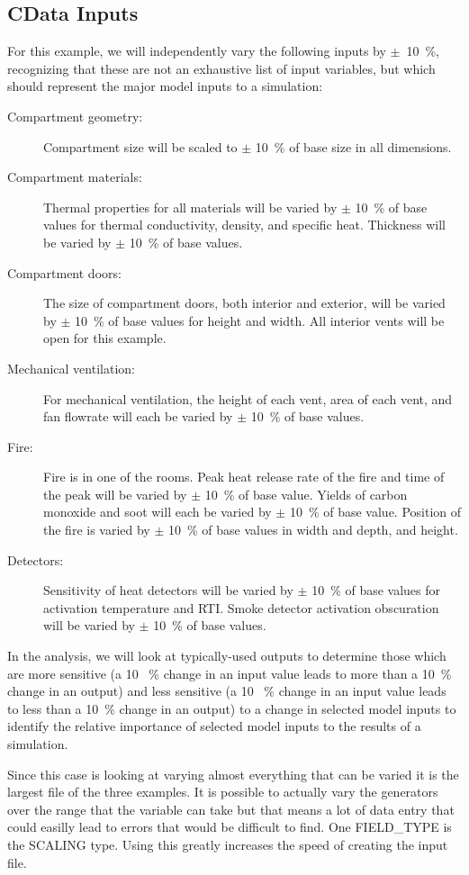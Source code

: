 \documentclass[12pt,twoside]{book}
\begin{document}
\subsection{CData Inputs}
For this example, we will independently vary the following inputs by $\pm$~10~\%, recognizing that these are not an exhaustive list of input variables, but which should represent the major model inputs to a simulation:

\begin{description}
\item[Compartment geometry:] Compartment size will be scaled to $\pm$ 10~\% of base size in all dimensions.
\item[Compartment materials:] Thermal properties for all materials will be varied by $\pm$ 10~\% of base values for thermal conductivity, density, and specific heat. Thickness will be  varied by $\pm$ 10~\% of base values.
\item[Compartment doors:] The size of compartment doors, both interior and exterior, will be  varied by $\pm$ 10~\% of base values for height and width. All interior vents will be open for this example.
\item[Mechanical ventilation:] For mechanical ventilation, the height of each vent, area of each vent, and fan flowrate will each be varied by $\pm$ 10~\% of base values.
\item[Fire:] Fire is in one of the rooms. Peak heat release rate of the fire and time of the peak will be varied by $\pm$ 10~\% of base value. Yields of carbon monoxide and soot will each be varied by $\pm$ 10~\% of base value. Position of the fire is varied by $\pm$ 10~\% of base values in width and depth, and height.
\item[Detectors:] Sensitivity of heat detectors will be varied by $\pm$ 10~\% of base values for activation temperature and RTI. Smoke detector activation obscuration will be varied by $\pm$ 10~\% of base values.
\end{description}

In the analysis, we will look at typically-used outputs to determine those which are more sensitive (a 10 ~\% change in an input value leads to more than a 10~\% change in an output) and less sensitive (a 10 ~\% change in an input value leads to less than a 10~\% change in an output) to a change in selected model inputs to identify the relative importance of selected model inputs to the results of a simulation.

Since this case is looking at varying almost everything that can be varied it is the largest file of the three examples. It is possible to actually vary the generators over the range that the variable can take but that means a lot of data entry that could easilly lead to errors that would be difficult to find. One FIELD\_TYPE is the SCALING type. Using this greatly increases the speed of creating the input file.
\end{document}
